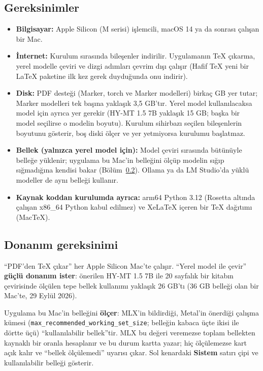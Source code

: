 \documentclass[11pt,a4paper]{article}
\newcommand{\dugme}[1]{\textsf{\bfseries #1}}
\newcommand{\dosya}[1]{\texttt{#1}}
\begin{document}
\subsection{Gereksinimler}
\begin{itemize}
  \item \textbf{Bilgisayar:} Apple Silicon (M serisi) işlemcili, macOS 14 ya
        da sonrası çalışan bir Mac.
  \item \textbf{İnternet:} Kurulum sırasında bileşenler indirilir.
        Uygulamanın TeX çıkarma, yerel modelle çeviri ve dizgi adımları
        çevrim dışı çalışır (Hafif TeX yeni bir LaTeX paketine ilk kez gerek
        duyduğunda onu indirir).
  \item \textbf{Disk:} PDF desteği (Marker, torch ve Marker modelleri) birkaç
        GB yer tutar; Marker modelleri tek başına yaklaşık 3,5 GB'tır. Yerel
        model kullanılacaksa model için ayrıca yer gerekir (HY-MT 1.5 7B
        yaklaşık 15 GB; başka bir model seçilirse o modelin boyutu). Kurulum
        sihirbazı seçilen bileşenlerin boyutunu gösterir, boş diski ölçer ve
        yer yetmiyorsa kurulumu başlatmaz.
  \item \textbf{Bellek (yalnızca yerel model için):} Model çeviri sırasında
        bütünüyle belleğe yüklenir; uygulama bu Mac'in belleğini ölçüp modelin
        sığıp sığmadığına kendisi bakar (Bölüm~\ref{sec:donanim}). Ollama ya da
        LM Studio'da yüklü modeller de aynı belleği kullanır.
  \item \textbf{Kaynak koddan kurulumda ayrıca:} arm64 Python 3.12
        (Rosetta altında çalışan x86\_64 Python kabul edilmez) ve XeLaTeX
        içeren bir TeX dağıtımı (MacTeX).
\end{itemize}

\subsection{Donanım gereksinimi}\label{sec:donanim}
``PDF'den TeX çıkar'' her Apple Silicon Mac'te çalışır. ``Yerel model ile
çevir'' \textbf{güçlü donanım ister}: önerilen HY-MT 1.5 7B ile 20 sayfalık bir
kitabın çevirisinde ölçülen tepe bellek kullanımı yaklaşık 26 GB'tı (36 GB
belleği olan bir Mac'te, 29 Eylül 2026).

Uygulama bu Mac'in belleğini \textbf{ölçer}: MLX'in bildirdiği, Metal'in
önerdiği çalışma kümesi (\dosya{max\_recommended\_working\_set\_size};
belleğin kabaca üçte ikisi ile dörtte üçü) ``kullanılabilir bellek''tir.
MLX bu değeri veremezse toplam bellekten kaynaklı bir oranla hesaplanır ve bu
durum kartta yazar; hiç ölçülemezse kart açık kalır ve ``bellek ölçülemedi''
uyarısı çıkar. Sol kenardaki \dugme{Sistem} satırı çipi ve kullanılabilir
belleği gösterir.
\end{document}
